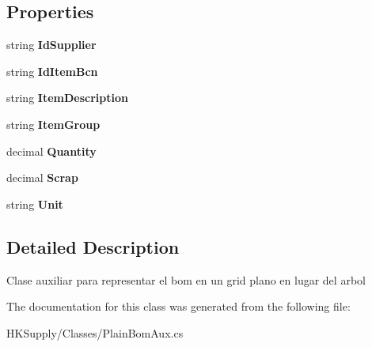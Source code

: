 \subsection*{Properties}
\begin{DoxyCompactItemize}
\item 
\mbox{\label{class_h_k_supply_1_1_classes_1_1_plain_bom_aux_a9aefd20063255cca2bd538bd3c66d001}} 
string {\bfseries Id\+Supplier}
\item 
\mbox{\label{class_h_k_supply_1_1_classes_1_1_plain_bom_aux_aa0b0262c7501657cbcf2e206a6c8107b}} 
string {\bfseries Id\+Item\+Bcn}
\item 
\mbox{\label{class_h_k_supply_1_1_classes_1_1_plain_bom_aux_a19dfccd2efef27eaaf73ed70c5b48b62}} 
string {\bfseries Item\+Description}
\item 
\mbox{\label{class_h_k_supply_1_1_classes_1_1_plain_bom_aux_aee2e2f82f8d6dbb5e89761d66496c02b}} 
string {\bfseries Item\+Group}
\item 
\mbox{\label{class_h_k_supply_1_1_classes_1_1_plain_bom_aux_adbce64859b04c445fa3535fce2122f65}} 
decimal {\bfseries Quantity}
\item 
\mbox{\label{class_h_k_supply_1_1_classes_1_1_plain_bom_aux_abf5f17a6d2a6f97507c02f1ed6d2de8a}} 
decimal {\bfseries Scrap}
\item 
\mbox{\label{class_h_k_supply_1_1_classes_1_1_plain_bom_aux_a991b32367eaa69e08219e3e644d6ea60}} 
string {\bfseries Unit}
\end{DoxyCompactItemize}


\subsection{Detailed Description}
Clase auxiliar para representar el bom en un grid plano en lugar del arbol 



The documentation for this class was generated from the following file\+:\begin{DoxyCompactItemize}
\item 
H\+K\+Supply/\+Classes/Plain\+Bom\+Aux.\+cs\end{DoxyCompactItemize}
